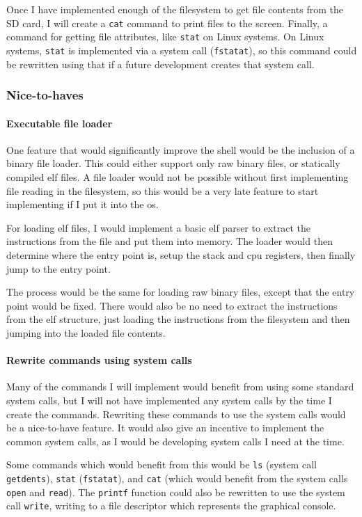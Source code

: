 \documentclass{article}
\begin{document}
Once I have implemented enough of the filesystem to get file contents from the
SD card, I will create a \texttt{cat} command to print files to the screen.
Finally, a command for getting file attributes, like \texttt{stat} on Linux
systems. On Linux systems, \texttt{stat} is implemented via a system call
(\texttt{fstatat}), so this command could be rewritten using that if a future
development creates that system call.

\subsubsection{Nice-to-haves}
\paragraph{Executable file loader}
One feature that would significantly improve the shell would be the inclusion
of a binary file loader. This could either support only raw binary files, or
statically compiled \gls{elf} files. A file loader would not be possible
without first implementing file reading in the filesystem, so this would be a
very late feature to start implementing if I put it into the \gls{os}.

For loading \gls{elf} files, I would implement a basic \gls{elf} parser to
extract the instructions from the file and put them into memory. The loader
would then determine where the entry point is, setup the stack and \gls{cpu}
registers, then finally jump to the entry point.

The process would be the same for loading raw binary files, except that the
entry point would be fixed. There would also be no need to extract the
instructions from the \gls{elf} structure, just loading the instructions from
the filesystem and then jumping into the loaded file contents.

\paragraph{Rewrite commands using system calls}
Many of the commands I will implement would benefit from using some standard
system calls, but I will not have implemented any system calls by the time I
create the commands. Rewriting these commands to use the system calls would be
a nice-to-have feature. It would also give an incentive to implement the
common system calls, as I would be developing system calls I need at the time.

Some commands which would benefit from this would be \texttt{ls} (system call
\texttt{getdents}), \texttt{stat} (\texttt{fstatat}), and \texttt{cat} (which
would benefit from the system calls \texttt{open} and \texttt{read}). The
\texttt{printf} function could also be rewritten to use the system call
\texttt{write}, writing to a file descriptor which represents the graphical
console.
\end{document}
